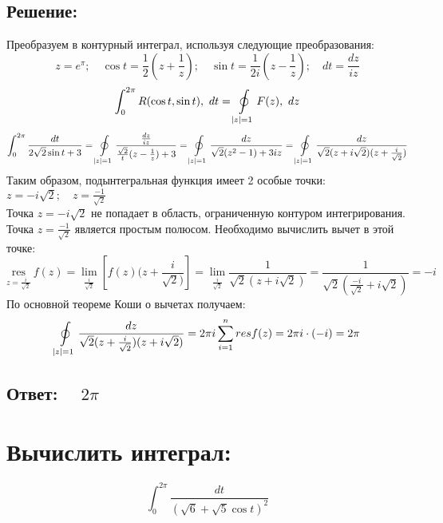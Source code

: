 \documentclass{article}
\begin{document}
         \subsection{Решение:}
         Преобразуем в контурный интеграл, используя следующие преобразования:
         $$z = e^\pi; \quad \cos{t} = \frac{1}{2}\left( z + \frac{1}{z}\right); \quad \sin{t} = \frac{1}{2i} \left( z - \frac{1}{z}\right); \quad dt = \frac{dz}{iz}$$
         \[
        \int_{0}^{2\pi} R(\cos{t}, \sin{t}) ,\ dt = \ointop_{|z| = 1} F(z) ,\ dz
        \]
        \[
        \int_{0}^{2\pi} \frac{dt}{2\sqrt{2}\sin{t} + 3} = \ointop_{|z| = 1} \frac{\frac{dz}{iz}}{\frac{\sqrt{2}}{t} (z - \frac{1}{z}) + 3} = \ointop_{|z| = 1} \frac{dz}{\sqrt{2} (z^2 - 1) + 3iz} = \ointop_{|z| = 1} \frac{dz}{\sqrt{2}(z + i\sqrt{2})(z + \frac{i}{\sqrt{2}})}
        \]
        Таким образом, подынтегральная функция имеет 2 особые точки: $z = -i\sqrt{2}; \quad z = \frac{-1}{\sqrt{2}}$ \\
        Точка $z = -i\sqrt{2}$ не попадает в область, ограниченную контуром интегрирования. \\
        Точка $z = \frac{-1}{\sqrt{2}}$ является простым полюсом. Необходимо вычислить вычет в этой точке:
         \[
         \underset{z = \frac{i}{\sqrt{2}}}{\text{res}}\ f(z) = \lim\limits_{\frac{i}{\sqrt{2}}} \left[ f(z)(z + \frac{i}{\sqrt{2})}\right] = \lim\limits_{\frac{i}{\sqrt{2}}} \frac{1}{\sqrt{2}(z + i\sqrt{2})} = \frac{1}{\sqrt{2}(\frac{-i}{\sqrt{2}} + {i}{\sqrt{2}})} = -i
        \]
        По основной теореме Коши о вычетах получаем:
        \[
         \ointop_{|z| = 1}\frac{dz}{\sqrt{2}(z +\frac{i}{\sqrt{2}}) (z + i\sqrt{2})} = 2\pi i \sum\limits_{i = 1}^{n} resf(z) = 2\pi i \cdot (-i) = 2\pi
        \]
        \subsection{Ответ: $\quad 2\pi$}

        \section{Вычислить интеграл: }
        \[
        \int_{0}^{2\pi} \frac{dt}{(\sqrt{6} + \sqrt{5}\cos{t})^2}
        \]
\end{document}
